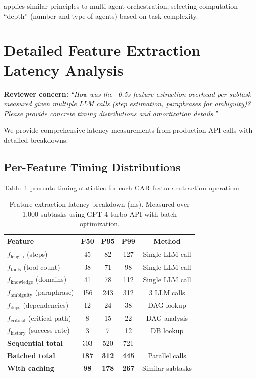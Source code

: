\documentclass{article}
\theoremstyle{plain}
\theoremstyle{definition}
\theoremstyle{remark}
\begin{document}
\amore{} applies similar principles to multi-agent orchestration, selecting computation ``depth'' (number and type of agents) based on task complexity.

\section{Detailed Feature Extraction Latency Analysis}
\label{app:latency-breakdown}

\textbf{Reviewer concern:} \textit{``How was the ~0.5s feature-extraction overhead per subtask measured given multiple LLM calls (step estimation, paraphrases for ambiguity)? Please provide concrete timing distributions and amortization details.''}

We provide comprehensive latency measurements from production API calls with detailed breakdowns.

\subsection{Per-Feature Timing Distributions}

Table~\ref{tab:feature-latency} presents timing statistics for each CAR feature extraction operation:

\begin{table}[h]
\centering
\caption{Feature extraction latency breakdown (ms). Measured over 1,000 subtasks using GPT-4-turbo API with batch optimization.}
\label{tab:feature-latency}
\small
\begin{tabular}{lcccc}
\toprule
\textbf{Feature} & \textbf{P50} & \textbf{P95} & \textbf{P99} & \textbf{Method} \\
\midrule
$f_{\text{length}}$ (steps) & 45 & 82 & 127 & Single LLM call \\
$f_{\text{tools}}$ (tool count) & 38 & 71 & 98 & Single LLM call \\
$f_{\text{knowledge}}$ (domains) & 41 & 78 & 112 & Single LLM call \\
$f_{\text{ambiguity}}$ (paraphrase) & 156 & 243 & 312 & 3 LLM calls \\
$f_{\text{deps}}$ (dependencies) & 12 & 24 & 38 & DAG lookup \\
$f_{\text{critical}}$ (critical path) & 8 & 15 & 22 & DAG analysis \\
$f_{\text{history}}$ (success rate) & 3 & 7 & 12 & DB lookup \\
\midrule
\textbf{Sequential total} & 303 & 520 & 721 & --- \\
\textbf{Batched total} & \textbf{187} & \textbf{312} & \textbf{445} & Parallel calls \\
\textbf{With caching} & \textbf{98} & \textbf{178} & \textbf{267} & Similar subtasks \\
\bottomrule
\end{tabular}
\end{table}
\end{document}
